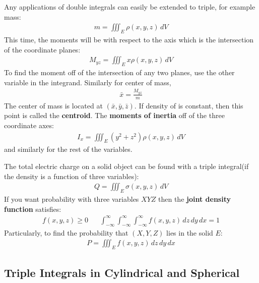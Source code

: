 \documentclass{article}
\begin{document}
Any applications of double integrals can easily be extended to triple, for example mass:
\begin{gather*}
    m = \iiint_E \rho(x,y,z) \, dV
\end{gather*}
This time, the moments will be with respect to the axis which is the intersection of the coordinate planes:
\begin{gather*}
    M_{yz} = \iiint_E x\rho(x,y,z) \, dV
\end{gather*}
To find the moment off of the intersection of any two planes, use the other variable in the integrand. Similarly for center of mass,
\begin{gather*}
    \bar{x} = \frac{M_{yz}}{m}
\end{gather*}
The center of mass is located at $(\bar{x},\bar{y},\bar{z})$. If density of is constant, then this point is called the \textbf{centroid}. The \textbf{moments of inertia} off of the three coordinate axes:
\begin{gather*}
    I_x = \iiint_E (y^2 + z^2) \rho(x,y,z) \, dV
\end{gather*}
and similarly for the rest of the variables.

The total electric charge on a solid object can be found with a triple integral(if the density is a function of three variables):
\begin{gather*}
    Q = \iiint_E \sigma(x,y,z)\, dV
\end{gather*}
If you want probability with three variables $XYZ$ then the \textbf{joint density function} satisfies:
\begin{gather*}
    f(x,y,z) \geqslant 0 \hspace{20pt} \int_{-\infty}^\infty\int_{-\infty}^\infty\int_{-\infty}^\infty f(x,y,z) \,dz \, dy \, dx = 1
\end{gather*}
Particularly, to find the probability that $(X,Y,Z)$ lies in the solid $E$:
\begin{gather*}
    P = \iiint_E f(x,y,z) \,dz\,dy\,dx
\end{gather*}
\subsection{Triple Integrals in Cylindrical and Spherical}
\end{document}
